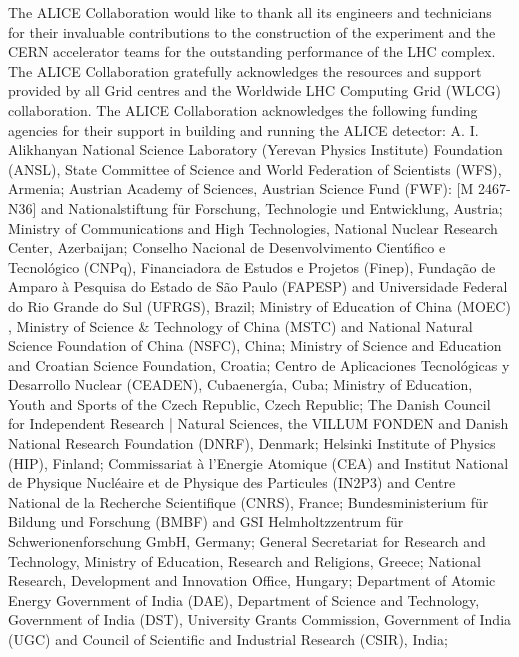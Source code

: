 
The ALICE Collaboration would like to thank all its engineers and technicians for their invaluable contributions to the construction of the experiment and the CERN accelerator teams for the outstanding performance of the LHC complex.
%
The ALICE Collaboration gratefully acknowledges the resources and support provided by all Grid centres and the Worldwide LHC Computing Grid (WLCG) collaboration.
%
The ALICE Collaboration acknowledges the following funding agencies for their support in building and running the ALICE detector:
%
A. I. Alikhanyan National Science Laboratory (Yerevan Physics Institute) Foundation (ANSL), State Committee of Science and World Federation of Scientists (WFS), Armenia;
%
Austrian Academy of Sciences, Austrian Science Fund (FWF): [M 2467-N36] and Nationalstiftung f\"{u}r Forschung, Technologie und Entwicklung, Austria;
%
Ministry of Communications and High Technologies, National Nuclear Research Center, Azerbaijan;
%
Conselho Nacional de Desenvolvimento Cient\'{\i}fico e Tecnol\'{o}gico (CNPq), Financiadora de Estudos e Projetos (Finep), Funda\c{c}\~{a}o de Amparo \`{a} Pesquisa do Estado de S\~{a}o Paulo (FAPESP) and Universidade Federal do Rio Grande do Sul (UFRGS), Brazil;
%
Ministry of Education of China (MOEC) , Ministry of Science \& Technology of China (MSTC) and National Natural Science Foundation of China (NSFC), China;
%
Ministry of Science and Education and Croatian Science Foundation, Croatia;
%
Centro de Aplicaciones Tecnol\'{o}gicas y Desarrollo Nuclear (CEADEN), Cubaenerg\'{\i}a, Cuba;
%
Ministry of Education, Youth and Sports of the Czech Republic, Czech Republic;
%
The Danish Council for Independent Research | Natural Sciences, the VILLUM FONDEN and Danish National Research Foundation (DNRF), Denmark;
%
Helsinki Institute of Physics (HIP), Finland;
%
Commissariat \`{a} l'Energie Atomique (CEA) and Institut National de Physique Nucl\'{e}aire et de Physique des Particules (IN2P3) and Centre National de la Recherche Scientifique (CNRS), France;
%
Bundesministerium f\"{u}r Bildung und Forschung (BMBF) and GSI Helmholtzzentrum f\"{u}r Schwerionenforschung GmbH, Germany;
%
General Secretariat for Research and Technology, Ministry of Education, Research and Religions, Greece;
%
National Research, Development and Innovation Office, Hungary;
%
Department of Atomic Energy Government of India (DAE), Department of Science and Technology, Government of India (DST), University Grants Commission, Government of India (UGC) and Council of Scientific and Industrial Research (CSIR), India;
